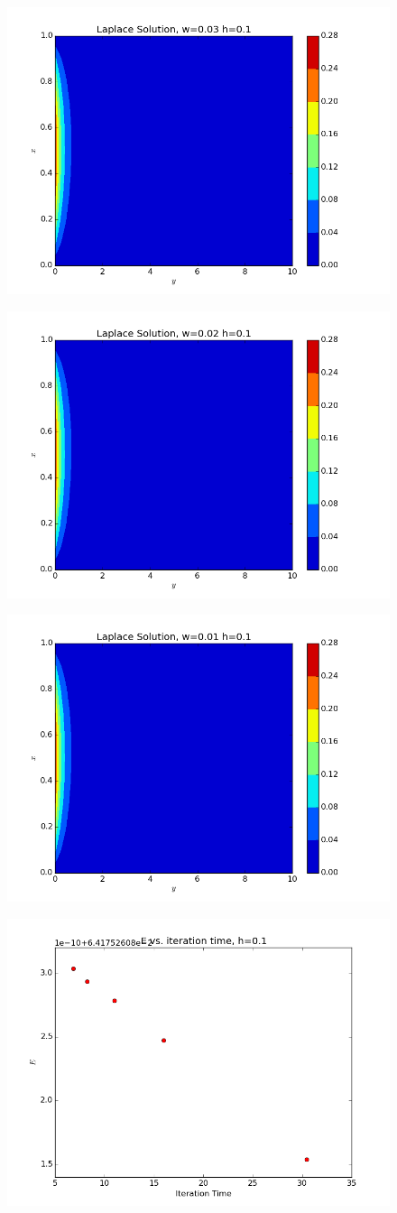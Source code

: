 \documentclass[10pt,letter]{article}
\begin{document}
\begin{figure}[H]
  \centering
    \includegraphics[width=.6\textwidth]{homework7_problem1_plot21}
\end{figure}
\begin{figure}[H]
  \centering
    \includegraphics[width=.6\textwidth]{homework7_problem1_plot22}
\end{figure}
\begin{figure}[H]
  \centering
    \includegraphics[width=.6\textwidth]{homework7_problem1_plot23}
\end{figure}
\begin{figure}[H]
  \centering
    \includegraphics[width=.6\textwidth]{homework7_problem1_plot24}
\end{figure}
\end{document}
